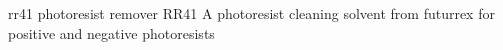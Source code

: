 \newglsXchemical%
{rr41}%
{photoresist remover}%
{RR41}%
{A photoresist cleaning solvent from \gls{futurrex} for positive and negative photoresists}%